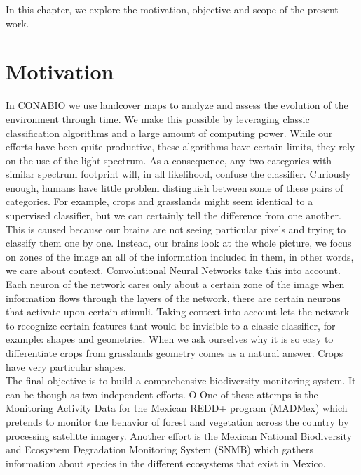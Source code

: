 In this chapter, we explore the motivation, objective and scope of the present work.\\


\section{Motivation}

In CONABIO we use landcover maps to analyze and assess the evolution of the environment through time. We make this possible by leveraging classic classification algorithms and a large amount of computing power. While our efforts have been quite productive, these algorithms have certain limits, they rely on the use of the light spectrum. As a consequence, any two categories with similar spectrum footprint will, in all likelihood, confuse the classifier. Curiously enough, humans have little problem distinguish between some of these pairs of categories. For example, crops and grasslands might seem identical to a supervised classifier, but we can certainly tell the difference from one another. This is caused because our brains are not seeing particular pixels and trying to classify them one by one. Instead, our brains look at the whole picture, we focus on zones of the image an all of the information included in them, in other words, we care about context. Convolutional Neural Networks take this into account. Each neuron of the network cares only about a certain zone of the image when information flows through the layers of the network, there are certain neurons that activate upon certain stimuli. Taking context into account lets the network to recognize certain features that would be invisible to a classic classifier, for example: shapes and geometries. When we ask ourselves why it is so easy to differentiate crops from grasslands geometry comes as a natural answer. Crops have very particular shapes.\\

The final objective is to build a comprehensive biodiversity monitoring system. It can be though as two independent efforts. O One of these attemps is the Monitoring Activity Data for the Mexican REDD+ program (MADMex) \cite{rs6053923} which pretends to monitor the behavior of forest and vegetation across the country by processing satelitte imagery. Another effort is the Mexican National Biodiversity and Ecosystem Degradation Monitoring System (SNMB) \cite{GARCIAALANIZ201762} which gathers information about species in the different ecosystems that exist in Mexico.\\

